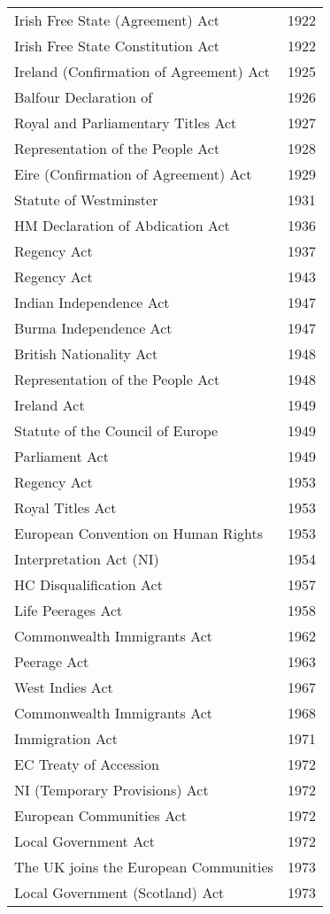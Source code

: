 \documentclass[14pt,titlepage]{extarticle}
\begin{document}
{\begin{longtable}{l l}
Irish Free State (Agreement) Act & 1922\\
Irish Free State Constitution Act & 1922\\
Ireland (Confirmation of Agreement) Act &  1925\\
Balfour Declaration of &  1926\\
Royal and Parliamentary Titles Act & 1927\\
Representation of the People Act &  1928\\
Eire (Confirmation of Agreement) Act &  1929\\
Statute of Westminster & 1931\\
HM Declaration of Abdication Act &  1936\\
Regency Act &  1937\\
Regency Act  & 1943\\
Indian Independence Act & 1947\\
Burma Independence Act & 1947\\
British Nationality Act &  1948\\
Representation of the People Act &  1948\\
Ireland Act  & 1949\\
Statute of the Council of Europe & 1949\\
Parliament Act  & 1949\\
Regency Act  & 1953\\
Royal Titles Act  & 1953\\
European Convention on Human Rights & 1953\\
Interpretation Act (NI) & 1954\\
HC Disqualification Act  & 1957\\
Life Peerages Act & 1958\\
Commonwealth Immigrants Act  & 1962\\
Peerage Act & 1963\\
West Indies Act &  1967\\
Commonwealth Immigrants Act  & 1968\\
Immigration Act & 1971\\
EC Treaty of Accession & 1972\\
NI (Temporary Provisions) Act & 1972\\
European Communities Act & 1972\\
Local Government Act & 1972\\
The UK joins the European Communities & 1973\\
Local Government (Scotland) Act & 1973\\

\end{longtable}}
\end{document}
